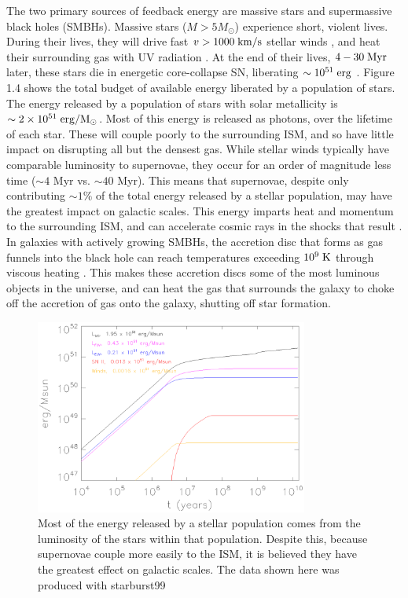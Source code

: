 The two primary sources of feedback energy are massive stars and supermassive
black holes (SMBHs).  Massive stars ($M>5M_\odot$) experience short, violent
lives.  During their lives, they will drive fast $v>1000\;\rm{km/s}$ stellar
winds \citep{Weaver1977}, and heat their surrounding gas with UV radiation
\citep{Krumholz2009}.  At the end of their lives, $4-30\;\rm{Myr}$ later, these
stars die in energetic core-collapse SN, liberating $\sim10^{51}\;\rm{erg}$
\citep{Wilson1985,Bethe1990}.  Figure 1.4 shows the total budget of available
energy liberated by a population of stars.  The energy released by a population
of stars with solar metallicity is $\sim 2\times10^{51}\;\rm{erg/M_\odot}$.
Most of this energy is released as photons, over the lifetime of each star.
These will couple poorly to the surrounding ISM, and so have little impact on
disrupting all but the densest gas.  While stellar winds typically have
comparable luminosity to supernovae, they occur for an order of magnitude less
time ($\sim4$ Myr vs. $\sim40$ Myr).  This means that supernovae, despite only
contributing $\sim1\%$ of the total energy released by a stellar population, may
have the greatest impact on galactic scales.  This energy imparts heat and
momentum to the surrounding ISM, and can accelerate cosmic rays in the shocks
that result \citep{Bell1978}.  In galaxies with actively growing SMBHs, the
accretion disc that forms as gas funnels into the black hole can reach
temperatures exceeding $10^9\;\rm{K}$ through viscous heating
\citep{Antonucci1993}.  This makes these accretion discs some of the most
luminous objects in the universe, and can heat the gas that surrounds the galaxy
to choke off the accretion of gas onto the galaxy, shutting off star formation.

\begin{figure}
    \includegraphics[width=0.8\textwidth]{FB_budget.ps}
    \caption[Stellar feedback energy budget]{Most of the energy released by a
    stellar population comes from the luminosity of the stars within that
    population.  Despite this, because supernovae couple more easily to the ISM,
    it is believed they have the greatest effect on galactic scales.  The data
    shown here was produced with {\sc starburst99} \citep{Leitherer1999}}
\end{figure}

